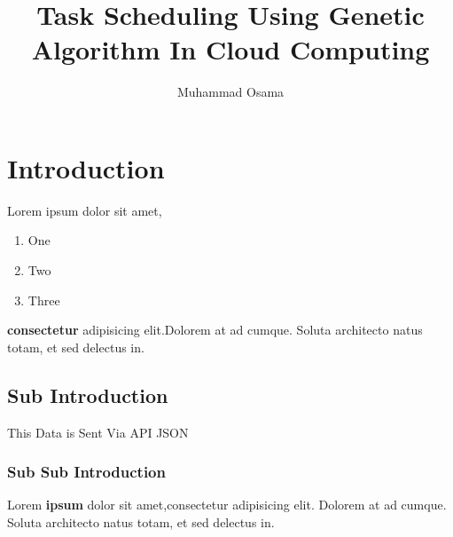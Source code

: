 \documentclass[stu,12pt,floatsintext]{apa7}%
\title{Task Scheduling Using Genetic Algorithm In Cloud Computing}%
\author{Muhammad Osama}%
\affiliation{National University of Computer and Emerging Sciences}%
\begin{document}
%
\normalsize%
\maketitle%
\section{Introduction}%
\label{sec:Introduction}%
Lorem ipsum dolor sit amet, \begin{enumerate}\item One\item Two\item Three\end{enumerate} \textbf{consectetur} adipisicing elit.Dolorem at ad cumque. Soluta architecto natus totam, \cite{Sample2024} et sed delectus in.%
\subsection{Sub Introduction}%
\label{subsec:SubIntroduction}%
This Data is Sent Via API JSON%
\subsubsection{Sub Sub Introduction}%
\label{ssubsec:SubSubIntroduction}%
Lorem \textbf{ipsum} dolor sit amet,consectetur adipisicing elit. Dolorem at ad cumque. Soluta architecto natus totam, et sed delectus in.

%
\printbibliography%
\end{document}
